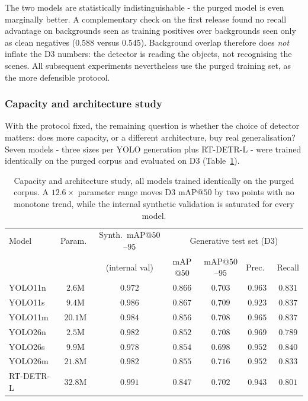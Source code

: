 The two models are statistically indistinguishable - the purged model is even
marginally better. A complementary check on the first release found no recall
advantage on backgrounds seen as training positives over backgrounds seen only
as clean negatives ($0.588$ versus $0.545$). Background overlap therefore does
\emph{not} inflate the D3 numbers: the detector is reading the objects, not
recognising the scenes. All subsequent experiments nevertheless use the purged
training set, as the more defensible protocol.

\subsubsection{Capacity and architecture study}

With the protocol fixed, the remaining question is whether the choice of
detector matters: does more capacity, or a different architecture, buy real
generalisation? Seven models - three sizes per YOLO generation plus RT-DETR-L -
were trained identically on the purged corpus and evaluated on D3
(Table~\ref{tab:p1-scaling}).

\begin{table}[h]
  \centering
  \begin{tabular}{lcccccc}
    \hline
    Model & Param.\ & Synth.\ mAP$@50$--$95$ & \multicolumn{4}{c}{Generative test set (D3)} \\
     & & (internal val) & mAP$@50$ & mAP$@50$--$95$ & Prec.\ & Recall \\
    \hline
    YOLO11n & $2.6$M & $0.972$ & $\mathbf{0.866}$ & $0.703$ & $0.963$ & $0.831$ \\
    YOLO11s & $9.4$M & $0.986$ & $0.867$ & $0.709$ & $0.923$ & $0.837$ \\
    YOLO11m & $20.1$M & $0.984$ & $0.856$ & $0.708$ & $0.965$ & $0.837$ \\
    YOLO26n & $2.5$M & $0.982$ & $0.852$ & $0.708$ & $0.969$ & $0.789$ \\
    YOLO26s & $9.9$M & $0.978$ & $0.854$ & $0.698$ & $0.952$ & $0.840$ \\
    YOLO26m & $21.8$M & $0.982$ & $0.855$ & $\mathbf{0.716}$ & $0.952$ & $0.833$ \\
    RT-DETR-L & $32.8$M & $\mathbf{0.991}$ & $0.847$ & $0.702$ & $0.943$ & $0.801$ \\
    \hline
  \end{tabular}
  \caption{Capacity and architecture study, all models trained identically on
  the purged corpus. A $12.6\times$ parameter range moves D3 mAP$@50$ by two
  points with no monotone trend, while the internal synthetic validation is
  saturated for every model.}
  \label{tab:p1-scaling}
\end{table}

